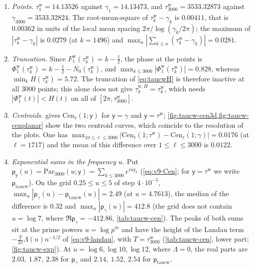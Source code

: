 \documentclass[11pt,a4paper]{article}
\numberwithin{equation}{section}
\theoremstyle{definition}
\theoremstyle{remark}
\begin{document}
\begin{enumerate}[label=(\roman*),leftmargin=*]
\item \emph{Points.} $\tau_1^{\mathrm w}=14.13526$ against $\gamma_1=14.13473$, and $\tau_{3000}^{\mathrm w}=3533.32873$ against $\gamma_{3000}=3533.32824$. The root-mean-square of $\tau^{\mathrm w}_k-\gamma_k$ is $0.00411$, that is $0.00362$ in units of the local mean spacing $2\pi/\log(\gamma_k/2\pi)$; the maximum of $|\tau^{\mathrm w}_k-\gamma_k|$ is $0.0279$ (at $k=1496$) and $\max_n|\sum_{k\le n}(\tau^{\mathrm w}_k-\gamma_k)|=0.0281$.
\item \emph{Truncation.} Since $F^{\mathrm w}_1(\tau_k^{\mathrm w})=k-\frac12$, the phase at the points is $\Phi^{\mathrm w}_1(\tau_k^{\mathrm w})=k-\frac12-N_0(\tau_k^{\mathrm w})$, and $\max_{k\le3000}|\Phi^{\mathrm w}_1(\tau_k^{\mathrm w})|=0.828$, whereas $\min_k H(\tau_k^{\mathrm w})=5.72$. The truncation of \eqref{eq:taucwH} is therefore inactive at all $3000$ points; this alone does not give $\tau^{\mathrm w,H}_k=\tau^{\mathrm w}_k$, which needs $|\Phi^{\mathrm w}_1(t)|<H(t)$ on all of $[2\pi,\tau^{\mathrm w}_{3000}]$.
\item \emph{Centroids.}  gives $\mathrm{Cen}_\ell(1;\mathsf y)$ for $\mathsf y=\gamma$ and $\mathsf y=\tau^{\mathrm w}$; \cref{fig:taucw-cen3d,fig:taucw-cenplanar} show the two centroid curves, which coincide to the resolution of the plots. One has $\max_{10\le\ell\le3000}|\mathrm{Cen}_\ell(1;\tau^{\mathrm w})-\mathrm{Cen}_\ell(1;\gamma)|=0.0176$ (at $\ell=1717$) and the mean of this difference over $1\le\ell\le3000$ is $0.0122$.
\item \emph{Exponential sums in the frequency $u$.} Put $\mathsf p_{\mathsf y}(u)=\mathrm{Par}_{3000}(u;\mathsf y)=\sum_{k\le3000}e^{iu\mathsf y_k}$ (\eqref{eq:v9-Cen}; for $\mathsf y=\tau^{\mathrm w}$ we write $\mathsf p_{\mathrm{taucw}}$). On the grid $0.25\le u\le5$ of step $4\cdot10^{-5}$, $\max_u|\mathsf p_\gamma(u)-\mathsf p_{\mathrm{taucw}}(u)|=2.49$ (at $u=4.7613$), the median of the difference is $0.32$ and $\max_u|\mathsf p_\gamma(u)|=412.8$ (the grid does not contain $u=\log7$, where $\Re\mathsf p_\gamma=-412.86$, \cref{tab:taucw-cen}). The peaks of both sums sit at the prime powers $u=\log p^m$ and have the height of the Landau term $-\frac T{2\pi}\Lambda(n)n^{-1/2}$ of \eqref{eq:v9-landau}, with $T=\tau^{\mathrm w}_{3000}$ (\cref{tab:taucw-cen}, lower part; \cref{fig:taucw-exp}). At $u=\log6,\log10,\log12$, where $\Lambda=0$, the real parts are $2.03,\ 1.87,\ 2.38$ for $\mathsf p_\gamma$ and $2.14,\ 1.52,\ 2.54$ for $\mathsf p_{\mathrm{taucw}}$.
\end{enumerate}
\end{document}
